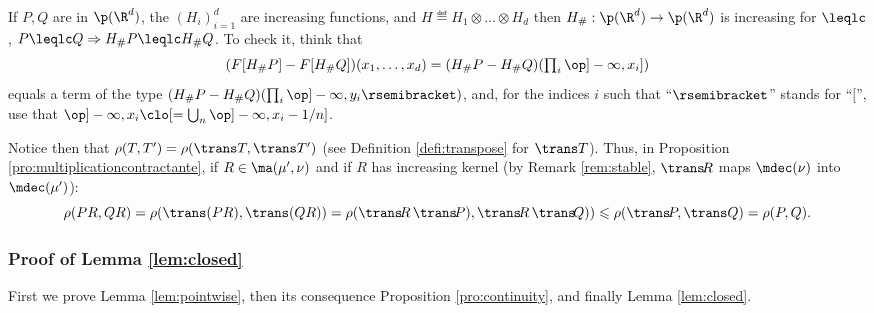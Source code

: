 \begin{rem}\label{rem:leqlc_et_Gs}If $P,Q$ are in $\p(\R^d)$, the $(H_i)_{i=1}^d$ are increasing functions, and $H\eqdef H_1\otimes\ldots\otimes H_d$ then $H_\#:\p(\R^d)\to\p(\R^d)$ is increasing for $\leqlc$, \ie $P\leqlc Q\Rightarrow H_\#P\leqlc H_\#Q$. To check it, think that\vspace*{-3pt}
\[\textstyle
(F[H_\#P]-F[H_\#Q])(x_1,\ldots,x_d)=(H_\#P-H_\#Q)(\prod_i\op]-\infty,x_i])
\]
equals a term of the type $(H_\#P-H_\#Q)(\prod_i\op]-\infty,y_i\rsemibracket)$, and, for the indices $i$ such that ``$\rsemibracket$'' stands for ``$[$'', use that $\op]-\infty,x_i\clo[=\bigcup_{n}\op]-\infty,x_i-1/n]$.
\end{rem}

\begin{rem}\label{rem:multiplicationcontractante} Notice then that $\rho(T,T')=\rho(\trans T,{\trans T'})$ (see Definition \ref{defi:transpose} for $\trans T$). Thus, in Proposition \ref{pro:multiplicationcontractante}, if $R\in\ma(\mu',\nu)$ and if $R$ has increasing kernel (\ie by Remark \ref{rem:stable}, $\trans\!R$ maps $\mdec(\nu)$ into $\mdec(\mu')$):\vspace*{-3pt}
\[\rho(PR,QR)=\rho(\trans(PR),{\trans (QR)})=\rho(\trans\!R\,\trans\!P),{\trans\!R\,\trans\!Q)})\leqslant\rho(\trans\!P,\trans Q)=\rho(P,Q).\]
\end{rem}

\subsubsection{Proof of Lemma \ref{lem:closed}}\label{subsec:MaInProcess}
First we prove Lemma \ref{lem:pointwise}, then its consequence Proposition \ref{pro:continuity}, and finally Lemma \ref{lem:closed}.

